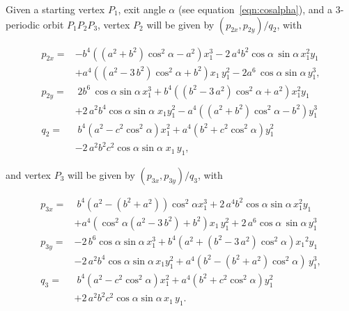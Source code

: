 \documentclass{article}
\theoremstyle{definition}
\begin{document}
Given a starting vertex $P_1$,  exit angle $\alpha$ (see equation~\eqref{eqn:cosalpha}), and a 3-periodic orbit $P_1P_2P_3$, vertex $P_2$ will be given by $(p_{2x},p_{2y})/q_2$, with \cite{garcia2019-ellipses}

\begin{align*}
p_{2x}=&-{b}^{4} \left(  \left(   a^2+{b}^{2}\right)\cos^{2}\alpha   -{a}^{2}  \right) x_1^{3}-2\,{a}^{4}{b}^{2} \cos \alpha  \,\sin  \alpha  \,  x_1^{2}{y_1}\\
&+{a}^{4} \left(  ({a
}^{2}-3\, {b}^{2}) \cos^{2} \alpha  +{b}^{2}
 \right) {x_1}\,y_1^{2}-2{a}^{6} \,\cos  \alpha  \sin   \alpha  \, y_1^{3} ,
\\
p_{2y}=&\; 2{b}^{6} \,\cos \alpha\sin \alpha\,   x_1^{3}+{b}^{4}\left(  ({b
 }^{2}-3\, {a}^{2}) \cos^{2} \alpha  +{a}^{2}
  \right) x_1^{2}{y_1}\\
&+  2\,{a}^{2} {b}^{4}\cos \alpha \sin
  \alpha \; {x_1} y_1^{2} -{
a}^{4}  \left(  \left(   a^2+{b}^{2}\right)\cos^{2}  \alpha  -{b}^{2}  \right)  y_1^{3}
\\
q_2=& \; {b}^{4} \left( a^2-c^2\cos^2\alpha   \right)
x_1^{2}+{a}^{4} \left(  {b}^{2}+c^2\cos^2 \alpha  
 \right) y_1^{2}\\
 & - 2\, {a}^{2}{b}^{2}{c^2}\cos \alpha\sin \alpha \; {x_1}\,{
y_1},
\end{align*}

and vertex $P_3$ will be given by $(p_{3x},p_{3y})/q_3$, with

\begin{align*}
p_{3x}=& \; {b}^{4} \left( {a}^{2}- \left( {b}^{2}+{a}^{2} \right) \right)
 \cos^{2}  \alpha   x_1^{3} +2\,{a}^{4}{b}^{2} \cos  \alpha \sin \alpha\,   x_1^{2}{ y_1}\\
 &+{a}^{4} \left( 
  \cos^{2}  \alpha  \left( {a}^{2}-3\,{b}^{2}
 \right) +{b}^{2} \right) { x_1}\, y_1^{2} +2\, {a}^{6} 
 \cos \alpha\,\sin \alpha\, y_1^{3}
\\
p_{3y}=&  -2\, {b}^{6} \cos \alpha\sin \alpha\, x_1^{3}+{b}^{4} \left( {a}^{2}+ \left( {b}^{2}-3\,{a}^{2} \right)    \cos^2\alpha \right) {{ x_1}}^{2}{ y_1}
\\
& -2\,{a}^{2}  {b}^{4}\cos
 \alpha  \sin \alpha\,  x_1 y_1^{2}+
 {a}^{4} \left( {b}^{2}- \left( {b}^{2}+{a}^{2} \right)   \cos^{2}  \alpha  \right)\,  y_1^{3},
\\
q_3=& \;{b}^{4} \left( {a}^{2}-{c^2}\cos^{2}\alpha   \right) x_1^{2}+{a}^{4} \left( {b}^{2}+c^2\cos^{2}\alpha  \right)  y_1^{2}\\
&+2\,{a}^{2}{b}^{
2} c^2 \cos\alpha \sin\alpha\, { x_1}\,{ y_1}.
\end{align*}
\end{document}
